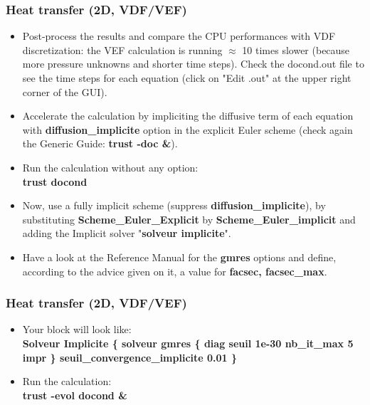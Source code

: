 \documentclass[10pt, hyperref={unicode=true,pdfusetitle, bookmarks=true,bookmarksnumbered=false,bookmarksopen=false, breaklinks=false,pdfborder={0 0 1},backref=true,colorlinks=true,linkcolor=darkblue,pageanchor}]{beamer}
\begin{document}
\begin{frame}
\frametitle{Heat transfer (2D, VDF/VEF)}
\begin{block}{}

\begin{itemize}
\item Post-process the results and compare the CPU performances with VDF discretization: the VEF calculation is running $\approx$ 10 times slower (because more pressure unknowns and shorter time steps). Check the docond.out file to see the time steps for each equation (click on "Edit .out" at the upper right corner of the GUI).

\item Accelerate the calculation by impliciting the diffusive term of each equation with \textbf{diffusion\_implicite} option in the explicit Euler scheme (check again the Generic Guide: \textbf{trust -doc \&}). 

\item Run the calculation without any option: \\
\textbf{trust docond}

\item \label{schema_impl} Now, use a fully implicit scheme (suppress \textbf{diffusion\_implicite}), by substituting \textbf{Scheme\_Euler\_Explicit} by \textbf{Scheme\_Euler\_implicit} and adding the Implicit solver "\textbf{solveur implicite}".

\item Have a look at the Reference Manual for the \textbf{gmres} options and define, according to the advice given on it, a value for \textbf{facsec, facsec\_max}.
\end{itemize}

\end{block}
\end{frame}
\begin{frame}
\frametitle{Heat transfer (2D, VDF/VEF)}
\begin{block}{}

\begin{itemize}
\item Your block will look like:\\
\textbf{Solveur Implicite \{ solveur gmres \{ diag seuil 1e-30 nb\_it\_max 5 impr \}  seuil\_convergence\_implicite 0.01  \} }

\item Run the calculation:\\
\textbf{trust -evol docond  \&}
\end{itemize}

\end{block}
\end{frame}
\end{document}
